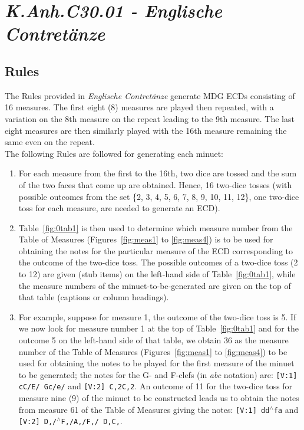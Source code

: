 \documentclass[letterpaper,x11names,svgnames,10pt]{article}
\begin{document}
\section{\em K.Anh.C30.01 - Englische Contret\"{a}nze}

\subsection{Rules}

The Rules provided in {\em Englische Contret\"{a}nze} generate MDG ECDs consisting of 16 measures.  The first eight (8) measures are played then repeated, with a variation on the 8th measure on the repeat leading to the 9th measure.  The last eight measures are then similarly played with the 16th measure remaining the same even on the repeat. \\

The following Rules are followed for generating each minuet:
\begin{enumerate}
	\item [1.] For each measure from the first to the 16th, two dice are tossed and the sum of the two faces that come up are obtained.  Hence, 16 two-dice tosses (with possible outcomes from the set \{2, 3, 4, 5, 6, 7, 8, 9, 10, 11, 12\}, one two-dice toss for each measure, are needed to generate an ECD).   
	\item [2.] Table~\ref{fig:0tab1} is then used to determine which measure number from the Table of Measures (Figures~\ref{fig:meas1} to \ref{fig:meas4}) is to be used for obtaining the notes for the particular measure of the ECD corresponding to the outcome of the two-dice toss.  The possible outcomes of a two-dice toss (2 to 12) are given (stub items) on the left-hand side of Table~\ref{fig:0tab1}, while the measure numbers of the minuet-to-be-generated are given on the top of that table (captions or column  headings).
	\item [3.]  For example, suppose for measure 1, the outcome of the two-dice toss is 5.  If we now look for measure number 1 at the top of Table~\ref{fig:0tab1} and for the outcome 5 on the left-hand side of that table, we obtain 36 as the measure number of the Table of Measures (Figures~\ref{fig:meas1} to \ref{fig:meas4}) to be used for obtaining the notes to be played for the first measure of the minuet to be generated; the notes for the G- and F-clefs (in {\it abc} notation) are:  {\tt [V:1] cC/E/ Gc/e/} and {\tt [V:2] C,2C,2}. An outcome of 11 for the two-dice toss for measure nine (9) of the minuet to be constructed leads us to obtain the notes from measure 61 of the Table of Measures giving the notes: {\tt [V:1] dd$^\wedge$fa} and {\tt [V:2] D,/$^\wedge$F,/A,/F,/ D,C,}.
\end{enumerate}   
\end{document}

